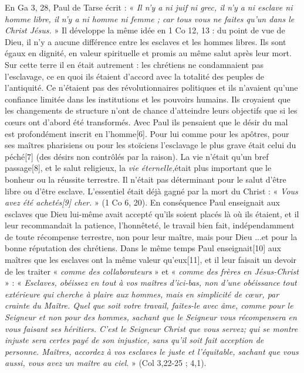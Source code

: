  En Ga 3, 28, Paul de Tarse écrit : « \emph{Il n'y a ni juif ni grec, il n'y a ni esclave ni homme libre, il n'y a ni homme ni femme ; car tous vous ne faites qu'un dans le Christ Jésus.} » Il développe la même idée en 1 Co 12, 13 : du point de vue de Dieu, il n'y a aucune différence entre les esclaves et les hommes libres. Ils sont égaux en dignité, en valeur spirituelle et promis au même salut après leur mort. Sur cette terre il en était autrement : les chrétiens ne condamnaient pas l'esclavage, ce en quoi ils étaient d'accord avec la totalité des peuples de l'antiquité. Ce n'étaient pas des révolutionnaires politiques et ils n'avaient qu'une confiance limitée dans les institutions et les pouvoirs humains. Ils croyaient que les changements de structure n'ont de chance d'atteindre leurs objectifs que si les cœurs ont d'abord été transformés. Avec Paul ils pensaient que le désir du mal est profondément inscrit en l'homme[6]. Pour lui comme pour les apôtres, pour ses maîtres pharisiens ou pour les stoïciens l'esclavage le plus grave était celui du péché[7] (des désirs non contrôlés par la raison). La vie n'était qu'un bref passage[8], et le salut religieux, la \emph{vie éternelle,}était plus important que le bonheur ou la réussite terrestre. Il n'était pas déterminant pour le salut d'être libre ou d'être esclave. L'essentiel était déjà gagné par la mort du Christ : « \emph{Vous avez été achetés[9] cher.} » (1 Co 6, 20). En conséquence Paul enseignait aux esclaves que Dieu lui-même avait accepté qu'ils soient placés là où ils étaient, et il leur recommandait la patience, l'honnêteté, le travail bien fait, indépendamment de toute récompense terrestre, non pour leur maître, mais pour Dieu ...et pour la bonne réputation des chrétiens. 
 Dans le même temps Paul enseignait[10] aux maîtres que les esclaves ont la même valeur qu'eux[11], et il leur faisait un devoir de les traiter « \emph{comme des collaborateurs} » et « \emph{comme des frères en Jésus-Christ} » : « \emph{Esclaves, obéissez en tout à vos maîtres d'ici-bas, non d'une obéissance tout extérieure qui cherche à plaire aux hommes, mais en simplicité de cœur, par crainte du Maître. Quel que soit votre travail, faites-le avec âme, comme pour le Seigneur et non pour des hommes, sachant que le Seigneur vous récompensera en vous faisant ses héritiers. C'est le Seigneur Christ que vous servez; qui se montre injuste sera certes payé de son injustice, sans qu'il soit fait acception de personne. Maîtres, accordez à vos esclaves le juste et l'équitable, sachant que vous aussi, vous avez un maître au ciel}. » (Col 3,22-25 ; 4,1). 
